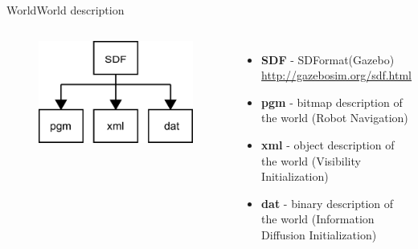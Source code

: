 \begin{frame}{World}{World description}

\begin{columns}
\begin{minipage}{\textwidth}
\begin{figure}
\centering
\includegraphics[width = \textwidth]{./figure/world_conversion.pdf}
\end{figure}
\end{minipage}

\begin{minipage}{\textwidth}
\begin{itemize}
\item \textbf{SDF} - SDFormat(Gazebo) \\
\url{http://gazebosim.org/sdf.html}
\item \textbf{pgm} - bitmap description of the world (Robot Navigation)
\item \textbf{xml} - object description of the world (Visibility Initialization)
\item \textbf{dat} - binary description of the world (Information Diffusion Initialization)
\end{itemize}
\end{minipage}
\end{columns}

\end{frame}